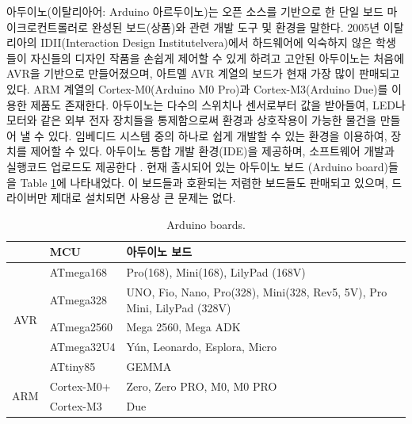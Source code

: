 아두이노(이탈리아어: Arduino 아르두이노)는 오픈 소스를 기반으로 한 단일 보드 마이크로컨트롤러로 완성된 보드(상품)와 관련 개발 도구 및 환경을 말한다. 2005년 이탈리아의 IDII(Interaction Design Institutelvera)에서 하드웨어에 익숙하지 않은 학생들이 자신들의 디자인 작품을 손쉽게 제어할 수 있게 하려고 고안된 아두이노는 처음에 AVR을 기반으로 만들어졌으며, 아트멜 AVR 계열의 보드가 현재 가장 많이 판매되고 있다. ARM 계열의 Cortex-M0(Arduino M0 Pro)과 Cortex-M3(Arduino Due)를 이용한 제품도 존재한다. 아두이노는 다수의 스위치나 센서로부터 값을 받아들여, LED나 모터와 같은 외부 전자 장치들을 통제함으로써 환경과 상호작용이 가능한 물건을 만들어 낼 수 있다. 임베디드 시스템 중의 하나로 쉽게 개발할 수 있는 환경을 이용하여, 장치를 제어할 수 있다.
아두이노 통합 개발 환경(IDE)을 제공하며, 소프트웨어 개발과 실행코드 업로드도 제공한다 \cite{wiki-arduino}. 
현재 출시되어 있는 아두이노 보드 (Arduino board)들을 Table \ref{table:arduino_boards}에 나타내었다. 이 보드들과 호환되는 저렴한 보드들도 판매되고 있으며, 드라이버만 제대로 설치되면 사용상 큰 문제는 없다. \cite{braun2009optical}

\begin{table}[]
	\caption{Arduino boards. \cite{wiki-arduino}}
	\begin{tabular}{c|l|l}
	\toprule[1pt]
		& MCU        & 아두이노 보드                                           \\ 
		\toprule[1pt]
	
		\multirow{5}{*}{AVR} & ATmega168  & Pro(168), Mini(168), LilyPad (168V)                                     \\
		& ATmega328  & UNO, Fio, Nano, Pro(328), Mini(328, Rev5, 5V), Pro Mini, LilyPad (328V) \\
		& ATmega2560 & Mega 2560, Mega ADK                                                     \\
		& ATmega32U4 & Yún, Leonardo, Esplora, Micro                                           \\
		& ATtiny85   & GEMMA                                                                   \\ 
		\midrule[1pt]
		\multirow{2}{*}{ARM} & Cortex-M0+ & Zero, Zero PRO, M0, M0 PRO                                              \\
		& Cortex-M3  & Due      \\
	\bottomrule[1pt]   
	\end{tabular}
	\label{table:arduino_boards}
\end{table}

